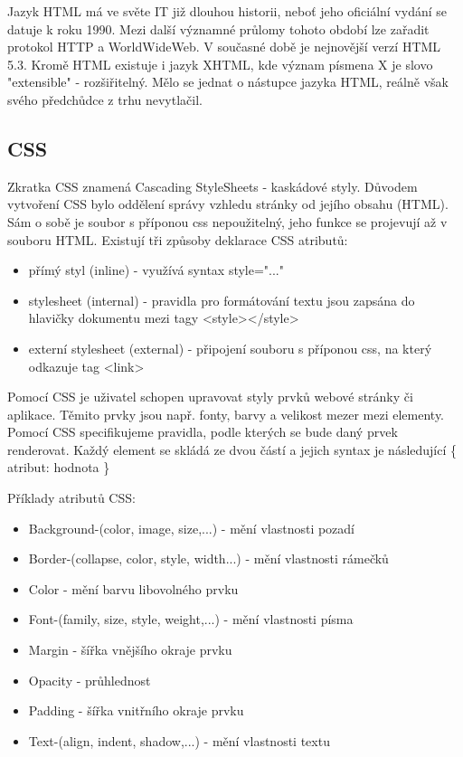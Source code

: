 Jazyk HTML má ve světe IT již dlouhou historii, neboť jeho oficiální vydání se datuje k roku 1990. Mezi další významné průlomy tohoto období lze zařadit protokol HTTP a WorldWideWeb. V současné době je nejnovější verzí HTML 5.3. Kromě HTML existuje i jazyk XHTML, kde význam písmena X je slovo "extensible" - rozšiřitelný. Mělo se jednat o nástupce jazyka HTML, reálně však svého předchůdce z trhu nevytlačil. \cite{Wrox}

\subsection{CSS}
Zkratka CSS znamená Cascading StyleSheets - kaskádové styly. Důvodem vytvoření CSS bylo oddělení správy vzhledu stránky od jejího obsahu (HTML). Sám o sobě je soubor s příponou css nepoužitelný, jeho funkce se projevují až v souboru HTML. Existují tři způsoby deklarace CSS atributů:

\begin{itemize}
\item přímý styl (inline) - využívá syntax style="..."
\item stylesheet (internal) - pravidla pro formátování textu jsou zapsána do hlavičky dokumentu mezi tagy <style></style>
\item externí stylesheet (external) - připojení souboru s příponou css, na který odkazuje tag <link>
\end{itemize}

Pomocí CSS je uživatel schopen upravovat styly prvků webové stránky či aplikace. Těmito prvky jsou např. fonty, barvy a velikost mezer mezi elementy. Pomocí CSS specifikujeme pravidla, podle kterých se bude daný prvek renderovat. Každý element se skládá ze dvou částí a jejich syntax je následující \{ atribut: hodnota \} \cite{jakpsatweb}

Příklady atributů CSS:
\begin {itemize}
\item Background-(color, image, size,...) - mění vlastnosti pozadí
\item Border-(collapse, color, style, width...) - mění vlastnosti rámečků
\item Color - mění barvu libovolného prvku
\item Font-(family, size, style, weight,...) - mění vlastnosti písma
\item Margin - šířka vnějšího okraje prvku
\item Opacity - průhlednost
\item Padding - šířka vnitřního okraje prvku
\item Text-(align, indent, shadow,...) - mění vlastnosti textu
\end {itemize}

